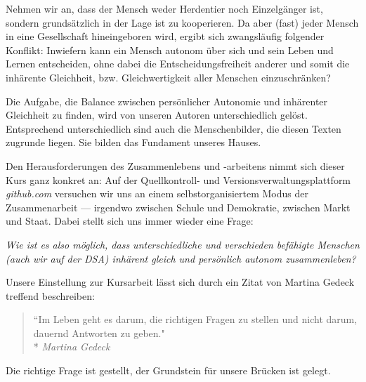 Nehmen wir an, dass der Mensch weder Herdentier noch Einzelgänger ist, sondern grundsätzlich in der Lage ist zu kooperieren.
Da aber (fast) jeder Mensch in eine Gesellschaft hineingeboren wird, ergibt sich zwangsläufig folgender Konflikt:
Inwiefern kann ein Mensch autonom über sich und sein Leben und Lernen entscheiden, ohne dabei die Entscheidungsfreiheit anderer und somit die inhärente Gleichheit, bzw. Gleichwertigkeit aller Menschen einzuschränken?

Die Aufgabe, die Balance zwischen persönlicher Autonomie und inhärenter Gleichheit zu finden, wird von unseren Autoren unterschiedlich gelöst.
Entsprechend unterschiedlich sind auch die Menschenbilder, die diesen Texten zugrunde liegen.
Sie bilden das Fundament unseres Hauses.

Den Herausforderungen des Zusammenlebens und -arbeitens nimmt sich dieser Kurs ganz konkret an:
Auf der Quellkontroll- und Versionsverwaltungsplattform \emph{github.com} versuchen wir uns an einem selbstorganisiertem Modus der Zusammenarbeit --- irgendwo zwischen Schule und Demokratie, zwischen Markt und Staat.
Dabei stellt sich uns immer wieder eine Frage:

\emph{Wie ist es also möglich, dass unterschiedliche und verschieden befähigte Menschen (auch wir auf der DSA) inhärent gleich und persönlich autonom zusammenleben?}

Unsere Einstellung zur Kursarbeit lässt sich durch ein Zitat von Martina Gedeck treffend beschreiben:

\begin{quote}
	``Im Leben geht es darum, die richtigen Fragen zu stellen und nicht darum, dauernd Antworten zu geben."\\*
	\emph{Martina Gedeck}
\end{quote}

Die richtige Frage ist gestellt, der Grundstein für unsere Brücken ist gelegt.